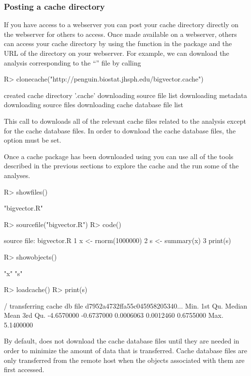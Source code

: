 \documentclass[nojss]{jss}
\begin{document}
\subsubsection{Posting a cache directory}


If you have access to a webserver you can post your cache directory
directly on the webserver for others to access.  Once made available
on a webserver, others can access your cache directory by using the
 function in the  package and the URL of
the directory on your webserver.  For example, we can download the
analysis corresponding to the ``'' file by calling
\begin{Schunk}
\begin{Sinput}
R> clonecache("http://penguin.biostat.jhsph.edu/bigvector.cache")
\end{Sinput}
\begin{Soutput}
created cache directory '.cache'
downloading source file list
downloading metadata
downloading source files
downloading cache database file list
\end{Soutput}
\end{Schunk}
This call to  downloads all of the relevant cache
files related to the analysis except for the cache database files.  In
order to download the cache database files, the option  must be set.

Once a cache package has been downloaded using  you
can use all of the tools described in the previous sections to explore
the cache and the run some of the analyses.
\begin{Schunk}
\begin{Sinput}
R> showfiles()
\end{Sinput}
\begin{Soutput}
[1] "bigvector.R"
\end{Soutput}
\begin{Sinput}
R> sourcefile("bigvector.R")
R> code()
\end{Sinput}
\begin{Soutput}
source file: bigvector.R
1  x <- rnorm(1000000)
2  s <- summary(x)
3  print(s)
\end{Soutput}
\begin{Sinput}
R> showobjects()
\end{Sinput}
\begin{Soutput}
[1] "x" "s"
\end{Soutput}
\begin{Sinput}
R> loadcache()
R> print(s)
\end{Sinput}
\begin{Soutput}
/ transferring cache db file d7952a4732ffa55c045958205340...
      Min.    1st Qu.     Median       Mean    3rd Qu. 
-4.6570000 -0.6737000  0.0006063  0.0012460  0.6755000 
      Max. 
 5.1400000 
\end{Soutput}
\end{Schunk}
By default,  does not download the cache database
files until they are needed in order to minimize the amount of data
that is transferred.  Cache database files are only transferred from
the remote host when the objects associated with them are first
accessed.
\end{document}
